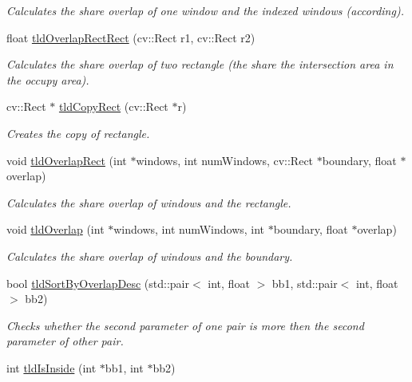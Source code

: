 \begin{DoxyCompactItemize}
\begin{DoxyCompactList}\small\item\em Calculates the share overlap of one window and the indexed windows (according). \end{DoxyCompactList}\item 
float \hyperlink{namespacetld_afdab54607fed863cdc408f72fd0f774b}{tld\-Overlap\-Rect\-Rect} (cv\-::\-Rect r1, cv\-::\-Rect r2)
\begin{DoxyCompactList}\small\item\em Calculates the share overlap of two rectangle (the share the intersection area in the occupy area). \end{DoxyCompactList}\item 
cv\-::\-Rect $\ast$ \hyperlink{namespacetld_aa09746d2aa3c9d71e4e0ba54d70d0e66}{tld\-Copy\-Rect} (cv\-::\-Rect $\ast$r)
\begin{DoxyCompactList}\small\item\em Creates the copy of rectangle. \end{DoxyCompactList}\item 
void \hyperlink{namespacetld_ae87c7dbe6b4da1e1923c42bec18caaf6}{tld\-Overlap\-Rect} (int $\ast$windows, int num\-Windows, cv\-::\-Rect $\ast$boundary, float $\ast$overlap)
\begin{DoxyCompactList}\small\item\em Calculates the share overlap of windows and the rectangle. \end{DoxyCompactList}\item 
void \hyperlink{namespacetld_aa9470de30170cb8b3f877dcae45df1b1}{tld\-Overlap} (int $\ast$windows, int num\-Windows, int $\ast$boundary, float $\ast$overlap)
\begin{DoxyCompactList}\small\item\em Calculates the share overlap of windows and the boundary. \end{DoxyCompactList}\item 
bool \hyperlink{namespacetld_acaf374df081816ecaf9079e200a8f5af}{tld\-Sort\-By\-Overlap\-Desc} (std\-::pair$<$ int, float $>$ bb1, std\-::pair$<$ int, float $>$ bb2)
\begin{DoxyCompactList}\small\item\em Checks whether the second parameter of one pair is more then the second parameter of other pair. \end{DoxyCompactList}\item 
int \hyperlink{namespacetld_a8b28e6d4868ad30e826a6248dd2ae7a0}{tld\-Is\-Inside} (int $\ast$bb1, int $\ast$bb2)

\end{DoxyCompactItemize}

